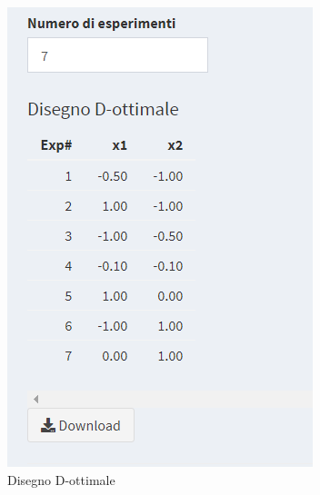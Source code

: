 \documentclass[
  11pt,
]{book}
\begin{document}
\begin{figure}[ht]

{\centering \includegraphics[width=1\linewidth]{Immagini/D_opt/06_es1_pticandidati} 

}

\caption{Disegno D-ottimale}\label{fig:fig6}
\end{figure}
\end{document}

